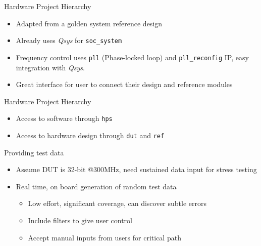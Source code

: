 \documentclass[t]{beamer}
\begin{document}
\begin{frame}{Hardware Project Hierarchy}
  \begin{itemize}[<+->]
    \item Adapted from a golden system reference design
  \end{itemize}
  \begin{figure}[H]
    \centering
    \resizebox{0.8\textwidth}{!}{%
      
    }
  \end{figure}
  \begin{itemize}[<+->]
    \item Already uses \textit{Qsys} for \texttt{soc\_system}
    \item Frequency control uses \texttt{pll} (Phase-locked loop) and \texttt{pll\_reconfig} IP, easy integration with \textit{Qsys}.
    \item Great interface for user to connect their design and reference modules
  \end{itemize}

\end{frame}

\begin{frame}{Hardware Project Hierarchy}
  \begin{figure}[H]
    \centering
    \resizebox{0.8\textwidth}{!}{%
      
    }
  \end{figure}
  \begin{itemize}[<+->]
    \item Access to software through \texttt{hps}
    \item Access to hardware design through \texttt{dut} and \texttt{ref}
  \end{itemize}
\end{frame}


\begin{frame}{Providing test data}
  \begin{itemize}
    \item<+-> Assume DUT is 32-bit @300MHz, need sustained data input for stress testing \newline
    \item<+-> Real time, on board generation of random test data
    \begin{itemize}
      \item Low effort, significant coverage, can discover subtle errors
      \item Include filters to give user control
      \item Accept manual inputs from users for critical path
    \end{itemize}
  \end{itemize}
\end{frame}
\end{document}
